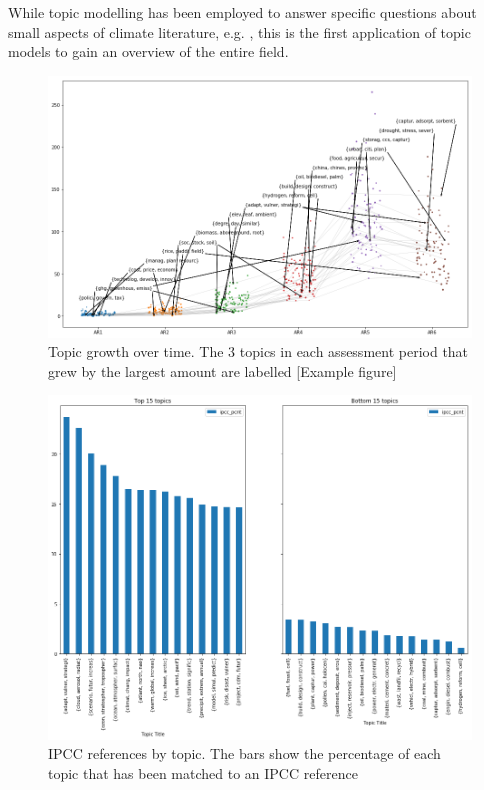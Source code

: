 \documentclass{article}
\begin{document}
While topic modelling has been employed to answer specific questions about small aspects of climate literature, e.g. \citep[e.g.][]{Minx2017FastEmissions, Grubert2016}, this is the first application of topic models to gain an overview of the entire field.







\begin{figure}
	\includegraphics[width=\linewidth]{plots/hot_topics_65}
    \caption{Topic growth over time. The 3 topics in each assessment period that grew by the largest amount are labelled [Example figure]}
    \label{topic_growth}
\end{figure}

\begin{figure}
	\includegraphics[width=\linewidth]{plots/ipcc_topics_65}
    \caption{IPCC references by topic. The bars show the percentage of each topic that has been matched to an IPCC reference}
    \label{IPCC}
\end{figure}
\end{document}
